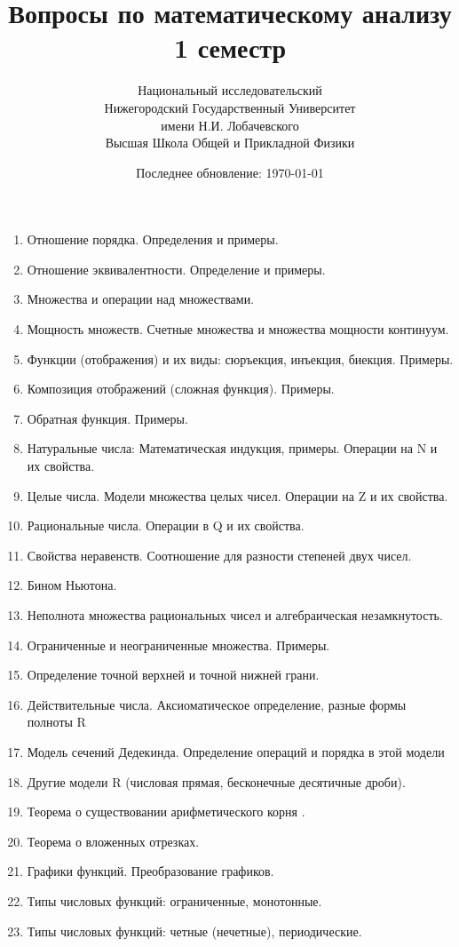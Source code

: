 \documentclass{article}
\title{Вопросы по математическому анализу \\ 1 семестр}
\date{Последнее обновление: \today}
\author{Национальный исследовательский \\
Нижегородский Государственный Университет \\
имени Н.И. Лобачевского \vspace{0.5em} \\
Высшая Школа Общей и Прикладной Физики \vspace{0.5em}}
\begin{document}
\maketitle
\begin{enumerate}
    \item Отношение порядка. Определения и примеры.
    \item Отношение эквивалентности. Определение и примеры.
    \item Множества и операции над множествами. 
    \item Мощность множеств. Счетные множества и множества мощности континуум. 
    \item Функции (отображения) и их виды: сюръекция, инъекция, биекция. Примеры. 
    \item Композиция отображений (сложная функция). Примеры. 
    \item Обратная функция. Примеры. 
    \item Натуральные числа: Математическая индукция, примеры. Операции на N и их свойства. 
    \item Целые числа. Модели множества целых чисел. Операции на Z и их свойства. 
    \item Рациональные числа. Операции в Q и их свойства. 
    \item Свойства неравенств. Соотношение для разности степеней двух чисел. 
    \item Бином Ньютона. 
    \item Неполнота множества рациональных чисел и алгебраическая незамкнутость. 
    \item Ограниченные и неограниченные множества. Примеры. 
    \item Определение точной верхней и точной нижней грани. 
    \item Действительные числа. Аксиоматическое определение, разные формы полноты R 
    \item Модель сечений Дедекинда. Определение операций и порядка в этой модели 
    \item Другие модели R (числовая прямая, бесконечные десятичные дроби). 
    \item Теорема о существовании арифметического корня . 
    \item Теорема о вложенных отрезках. 
    \item Графики функций. Преобразование графиков. 
    \item Типы числовых функций: ограниченные, монотонные. 
    \item Типы числовых функций: четные (нечетные), периодические. 

\end{enumerate}
\end{document}

